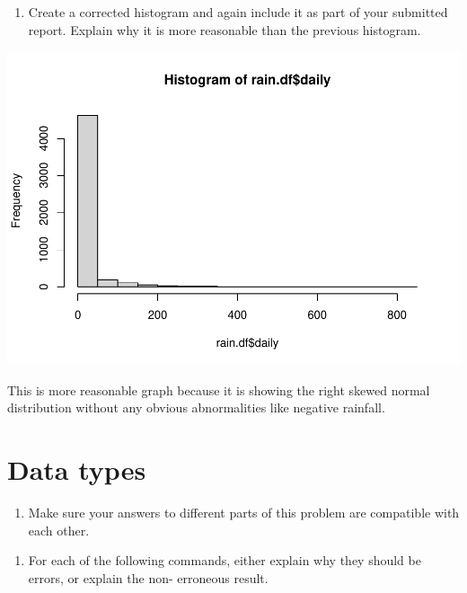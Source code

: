 \documentclass[
]{article}
\newenvironment{Shaded}{\begin{snugshade}}{\end{snugshade}}
\newcommand{\FunctionTok}[1]{\textcolor[rgb]{0.00,0.00,0.00}{#1}}
\newcommand{\NormalTok}[1]{#1}
\newcommand{\SpecialCharTok}[1]{\textcolor[rgb]{0.00,0.00,0.00}{#1}}
\providecommand{\tightlist}{%
  \setlength{\itemsep}{0pt}\setlength{\parskip}{0pt}}
\begin{document}
\begin{enumerate}
\def\labelenumi{\alph{enumi}.}
\setcounter{enumi}{10}
\tightlist
\item
  Create a corrected histogram and again include it as part of your
  submitted report. Explain why it is more reasonable than the previous
  histogram.
\end{enumerate}

\begin{Shaded}
\end{Shaded}

\includegraphics{HW1-Trinath-Sai-Subhash-Reddy-Pittala_files/figure-latex/unnamed-chunk-11-1.pdf}

This is more reasonable graph because it is showing the right skewed
normal distribution without any obvious abnormalities like negative
rainfall.

\hypertarget{data-types}{%
\section{Data types}\label{data-types}}

\begin{enumerate}
\def\labelenumi{\arabic{enumi}.}
\setcounter{enumi}{1}
\tightlist
\item
  Make sure your answers to different parts of this problem are
  compatible with each other.
\end{enumerate}

\begin{enumerate}
\def\labelenumi{\alph{enumi}.}
\tightlist
\item
  For each of the following commands, either explain why they should be
  errors, or explain the non- erroneous result.
\end{enumerate}
\end{document}
